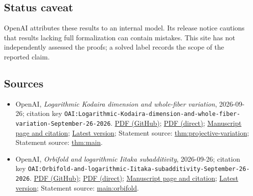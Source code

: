 \documentclass[11pt]{article}
\begin{document}
\subsection{Status caveat}
OpenAI attributes these results to an internal model. Its release notice cautions that results lacking full formalization can contain mistakes. This site has not independently assessed the proofs; a solved label records the scope of the reported claim.

\subsection{Sources}
\begin{itemize}
\item OpenAI, \emph{Logarithmic Kodaira dimension and whole-fiber variation}, 2026-09-26; citation key \texttt{OAI:Logarithmic-Kodaira-dimension-and-whole-fiber-variation-September-26-2026}. \href{https://github.com/openai/math/blob/adc7f1241b42e322a6451854ab7e4b4c146bf78a/preprints/Logarithmic-Kodaira-dimension-and-whole-fiber-variation-September-26-2026/paper.pdf}{PDF (GitHub)}; \href{https://github.com/openai/math/raw/adc7f1241b42e322a6451854ab7e4b4c146bf78a/preprints/Logarithmic-Kodaira-dimension-and-whole-fiber-variation-September-26-2026/paper.pdf}{PDF (direct)}; \href{https://github.com/openai/math/blob/adc7f1241b42e322a6451854ab7e4b4c146bf78a/preprints/Logarithmic-Kodaira-dimension-and-whole-fiber-variation-September-26-2026/README.md}{Manuscript page and citation}; \href{https://github.com/openai/math/blob/main/preprints/Logarithmic-Kodaira-dimension-and-whole-fiber-variation-September-26-2026/paper.pdf}{Latest version}; Statement source: \href{https://github.com/openai/math/blob/adc7f1241b42e322a6451854ab7e4b4c146bf78a/preprints/Logarithmic-Kodaira-dimension-and-whole-fiber-variation-September-26-2026/build/sections/01-introduction.tex\#L70}{thm:projective-variation}; Statement source: \href{https://github.com/openai/math/blob/adc7f1241b42e322a6451854ab7e4b4c146bf78a/preprints/Logarithmic-Kodaira-dimension-and-whole-fiber-variation-September-26-2026/build/sections/01-introduction.tex\#L38}{thm:main}.
\item OpenAI, \emph{Orbifold and logarithmic Iitaka subadditivity}, 2026-09-26; citation key \texttt{OAI:Orbifold-and-logarithmic-Iitaka-subadditivity-September-26-2026}. \href{https://github.com/openai/math/blob/adc7f1241b42e322a6451854ab7e4b4c146bf78a/preprints/Orbifold-and-logarithmic-Iitaka-subadditivity-September-26-2026/paper.pdf}{PDF (GitHub)}; \href{https://github.com/openai/math/raw/adc7f1241b42e322a6451854ab7e4b4c146bf78a/preprints/Orbifold-and-logarithmic-Iitaka-subadditivity-September-26-2026/paper.pdf}{PDF (direct)}; \href{https://github.com/openai/math/blob/adc7f1241b42e322a6451854ab7e4b4c146bf78a/preprints/Orbifold-and-logarithmic-Iitaka-subadditivity-September-26-2026/README.md}{Manuscript page and citation}; \href{https://github.com/openai/math/blob/main/preprints/Orbifold-and-logarithmic-Iitaka-subadditivity-September-26-2026/paper.pdf}{Latest version}; Statement source: \href{https://github.com/openai/math/blob/adc7f1241b42e322a6451854ab7e4b4c146bf78a/preprints/Orbifold-and-logarithmic-Iitaka-subadditivity-September-26-2026/build/sections/introduction.tex\#L135}{main:orbifold}.

\end{itemize}
\end{document}
